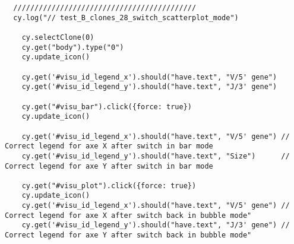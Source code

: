 \begin{verbatim}
  ///////////////////////////////////////////
  cy.log("// test_B_clones_28_switch_scatterplot_mode")

    cy.selectClone(0)
    cy.get("body").type("0")
    cy.update_icon()

    cy.get('#visu_id_legend_x').should("have.text", "V/5' gene")
    cy.get('#visu_id_legend_y').should("have.text", "J/3' gene")

    cy.get("#visu_bar").click({force: true})
    cy.update_icon()

    cy.get('#visu_id_legend_x').should("have.text", "V/5' gene") // Correct legend for axe X after switch in bar mode
    cy.get('#visu_id_legend_y').should("have.text", "Size")      // Correct legend for axe Y after switch in bar mode

    cy.get("#visu_plot").click({force: true})
    cy.update_icon()
    cy.get('#visu_id_legend_x').should("have.text", "V/5' gene") // Correct legend for axe X after switch back in bubble mode"
    cy.get('#visu_id_legend_y').should("have.text", "J/3' gene") // Correct legend for axe Y after switch back in bubble mode"


\end{verbatim}


